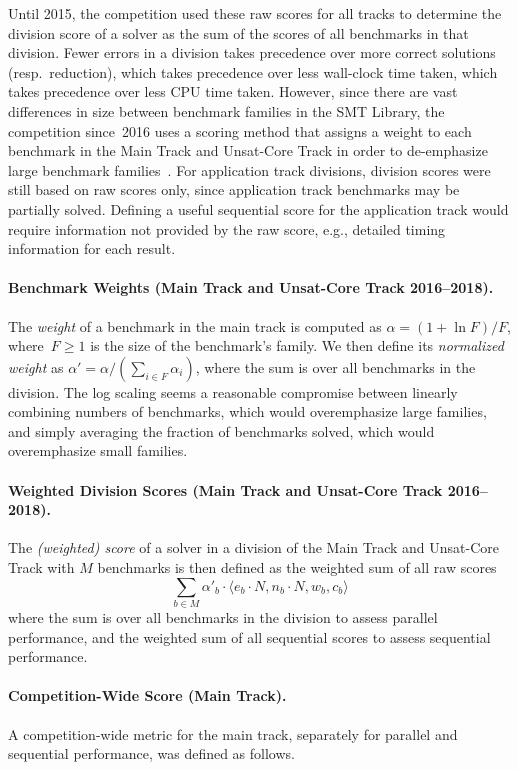 \documentclass[dvipsnames,table,twoside,11pt]{article}
\newcommand{\maintrack}{Main Track\xspace}
\newcommand{\ucoretrack}{Unsat-Core Track\xspace}
\begin{document}
Until 2015, the competition used these raw scores for all tracks to determine
the division score of a solver as the sum of the scores of all benchmarks in
that division.
Fewer errors in a division takes precedence over more correct solutions
(resp.~reduction), which takes precedence over less wall-clock time taken,
which takes precedence over less CPU time taken.
However, since there are vast differences in size between benchmark families in
the SMT Library, the competition since~2016 uses a scoring method that assigns
a weight to each benchmark in the \maintrack and \ucoretrack in order to
de-emphasize large benchmark families~\cite{rules16,rules17,rules18}.
For application track divisions, division scores were still based on raw scores
only, since application track benchmarks may be partially solved. Defining a
useful sequential score for the application track would require information not
provided by the raw score, e.g., detailed timing information for each result.

\paragraph{Benchmark Weights (\maintrack and \ucoretrack 2016--2018).} The \emph{weight} of a
benchmark in the main track is computed as $\alpha = (1 + \ln F)/F$,
where~$F\geq 1$ is the size of the benchmark's family.  We then define its
\emph{normalized weight} as $\alpha' = \alpha / (\sum_{i\in F} \alpha_i)$,
where the sum is over all benchmarks in the division.  The log scaling seems a
reasonable compromise between linearly combining numbers of benchmarks, which
would overemphasize large families, and simply averaging the fraction of
benchmarks solved, which would overemphasize small families.

\paragraph{Weighted Division Scores (\maintrack and \ucoretrack 2016--2018).}
The \emph{(weighted) score} of a solver in a division of the \maintrack and
\ucoretrack with $M$ benchmarks is then defined as the weighted sum of all raw
scores $$\sum_{b\in M} \alpha'_b \cdot \langle e_b \cdot N, n_b \cdot N,
w_b, c_b\rangle$$ where the sum is over all benchmarks in the division to
assess parallel performance, and the weighted sum of all sequential scores to
assess sequential performance.

\paragraph{Competition-Wide Score (\maintrack).}
A competition-wide metric for the main track, separately for
parallel and sequential performance, was defined as follows.
\end{document}
